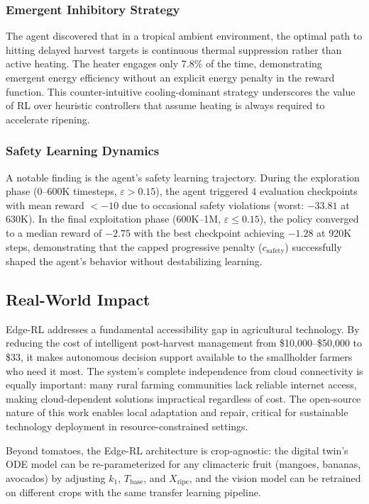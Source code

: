 \documentclass[conference]{IEEEtran}
\begin{document}
    \subsubsection{Emergent Inhibitory Strategy}
    The agent discovered that in a tropical ambient environment, the optimal path to hitting delayed harvest targets is continuous thermal suppression rather than active heating. The heater engages only 7.8\% of the time, demonstrating emergent energy efficiency without an explicit energy penalty in the reward function. This counter-intuitive cooling-dominant strategy underscores the value of RL over heuristic controllers that assume heating is always required to accelerate ripening.

    \subsubsection{Safety Learning Dynamics}
    A notable finding is the agent's safety learning trajectory. During the exploration phase (0--600K timesteps, $\varepsilon > 0.15$), the agent triggered 4 evaluation checkpoints with mean reward $< -10$ due to occasional safety violations (worst: $-33.81$ at 630K).  In the final exploitation phase (600K--1M, $\varepsilon \leq 0.15$), the policy converged to a median reward of $-2.75$ with the best checkpoint achieving $-1.28$ at 920K steps, demonstrating that the capped progressive penalty ($c_{\text{safety}}$) successfully shaped the agent's behavior without destabilizing learning.

    \subsection{Real-World Impact}

    Edge-RL addresses a fundamental accessibility gap in agricultural technology. By reducing the cost of intelligent post-harvest management from \$10,000--\$50,000 to \$33, it makes autonomous decision support available to the smallholder farmers who need it most. The system's complete independence from cloud connectivity is equally important: many rural farming communities lack reliable internet access, making cloud-dependent solutions impractical regardless of cost. The open-source nature of this work enables local adaptation and repair, critical for sustainable technology deployment in resource-constrained settings.

    Beyond tomatoes, the Edge-RL architecture is crop-agnostic: the digital twin's ODE model can be re-parameterized for any climacteric fruit (mangoes, bananas, avocados) by adjusting $k_1$, $T_{\text{base}}$, and $X_{\text{ripe}}$, and the vision model can be retrained on different crops with the same transfer learning pipeline.
\end{document}
